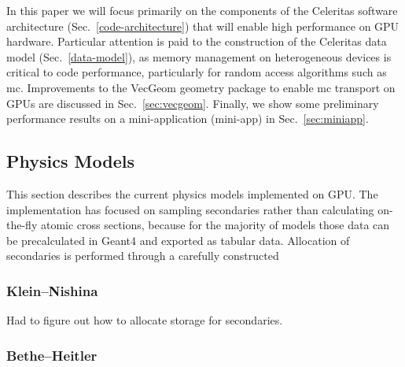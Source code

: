 \documentclass{webofc}
\begin{document}

In this paper we will focus primarily on the components of the Celeritas
software architecture (Sec.~\ref{code-architecture}) that will enable high
performance on GPU hardware.  Particular attention is paid to the construction
of the Celeritas data model (Sec.~\ref{data-model}), as memory management on
heterogeneous devices is critical to code performance, particularly for random
access algorithms such as \ac{mc}.  Improvements to the VecGeom geometry package to enable \ac{mc} transport on GPUs are discussed in Sec.~\ref{sec:vecgeom}.  Finally, we show some preliminary performance results on a mini-application (mini-app) in Sec.~\ref{sec:miniapp}.



\subsection{Physics Models}
\label{sec:physics-models}

This section describes the current physics models implemented on GPU. The
implementation has focused on sampling secondaries rather than calculating
on-the-fly atomic cross sections, because for the majority of models those data
can be precalculated in Geant4 and exported as tabular data. Allocation of
secondaries is performed through a carefully constructed

\subsubsection{Klein--Nishina}

Had to figure out how to allocate storage for secondaries.

\subsubsection{Bethe--Heitler}
\end{document}
